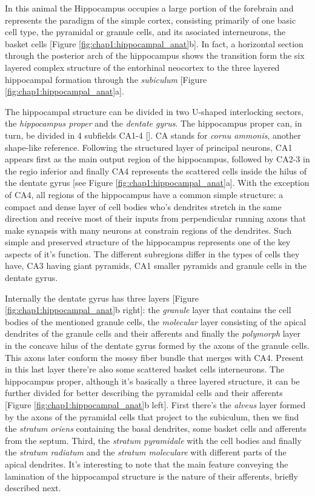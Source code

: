 In this animal the Hippocampus occupies a large portion of the forebrain and represents the paradigm of the simple cortex, consisting primarily of one basic cell type, the pyramidal or granule cells, and its asociated interneurons, the basket cells [Figure \ref{fig:chap1:hippocampal_anat}b]. 
In fact, a horizontal section through the posterior arch of the hippocampus shows the transition form the six layered complex structure of the entorhinal neocortex to the three layered hippocampal formation through the \textit{subiculum} [Figure \ref{fig:chap1:hippocampal_anat}a].

The hippocampal structure can be divided in two U-shaped interlocking sectors, the \textit{hippocampus proper} and the \textit{dentate gyrus}. 
The hippocampus proper can, in turn, be divided in 4 subfields CA1-4 [\cite{lorente1934}].
CA stands for \textit{cornu ammonis}, another shape-like reference. 
Following the structured layer of principal neurons, CA1 appears first as the main output region of the hippocampus, followed by CA2-3 in the regio inferior and finally CA4 represents the scattered cells inside the hilus of the dentate gyrus [see Figure \ref{fig:chap1:hippocampal_anat}a]. 
With the exception of CA4, all regions of the hippocampus have a common simple structure: a compact and dense layer of cell bodies who's dendrites stretch in the same direction and receive most of their inputs from perpendicular running axons that make synapsis with many neurons at constrain regions of the dendrites. 
Such simple and preserved structure of the hippocampus represents one of the key aspects of it's function. 
The different subregions differ in the types of cells they have, CA3 having giant pyramids, CA1 smaller pyramids and granule cells in the dentate gyrus. 

Internally the dentate gyrus has three layers [Figure \ref{fig:chap1:hippocampal_anat}b right]: the \textit{granule} layer that contains the cell bodies of the mentioned granule cells, the \textit{molecular} layer consisting of the apical dendrites of the granule cells and their afferents and finally the \textit{polymorph} layer in the concave hilus of the dentate gyrus formed by the axons of the granule cells.
This axons later conform the mossy fiber bundle that merges with CA4. Present in this last layer there're also some scattered basket cells interneurons.
The hippocampus proper, although it's basically a three layered structure, it can be further divided for better describing the pyramidal cells and their afferents [Figure \ref{fig:chap1:hippocampal_anat}b left].
First there's the \textit{alveus} layer formed by the axons of the pyramidal cells that project to the subiculum, then we find the \textit{stratum oriens} containing the basal dendrites, some basket cells and afferents from the septum.
Third, the \textit{stratum pyramidale} with the cell bodies and finally the \textit{stratum radiatum} and the \textit{stratum moleculare} with different parts of the apical dendrites.
It's interesting to note that the main feature conveying the lamination of the hippocampal structure is the nature of their afferents, briefly described next.

